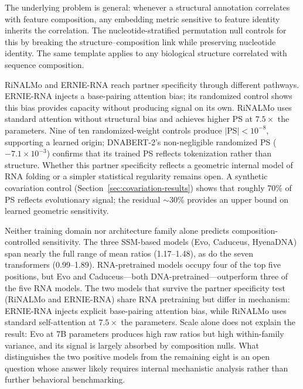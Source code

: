 \documentclass[11pt]{article}
\begin{document}
The underlying problem is general: whenever a structural annotation
correlates with feature composition, any embedding metric sensitive to
feature identity inherits the correlation. The nucleotide-stratified
permutation null controls for this by breaking the structure--composition
link while preserving nucleotide identity. The same template applies to
any biological structure correlated with sequence composition.

RiNALMo and ERNIE-RNA reach partner specificity through different pathways.
ERNIE-RNA injects a base-pairing attention bias; its randomized control
shows this bias provides capacity without producing signal on its own.
RiNALMo uses standard attention without structural bias and achieves higher
PS at $7.5\times$ the parameters. Nine of ten randomized-weight controls
produce $|\text{PS}| < 10^{-8}$, supporting a learned origin; DNABERT-2's
non-negligible randomized PS ($-7.1 \times 10^{-3}$) confirms that its trained
PS reflects tokenization rather than structure. Whether
this partner specificity reflects a geometric internal model of RNA folding
or a simpler statistical regularity remains open. A synthetic
covariation control (Section~\ref{sec:covariation-results}) shows that
roughly 70\% of PS reflects evolutionary signal; the residual
$\sim$30\% provides an upper bound on learned geometric sensitivity.

Neither training domain nor architecture family alone predicts
composition-controlled sensitivity. The three SSM-based models (Evo,
Caduceus, HyenaDNA) span nearly the full range of mean ratios
(1.17--1.48), as do the seven transformers (0.99--1.89). RNA-pretrained
models occupy four of the top five positions, but Evo and Caduceus---both
DNA-pretrained---outperform three of the five RNA models. The two models
that survive the partner specificity test (RiNALMo and ERNIE-RNA) share
RNA pretraining but differ in mechanism: ERNIE-RNA injects explicit
base-pairing attention bias, while RiNALMo uses standard self-attention at
$7.5\times$ the parameters. Scale alone does not explain the result:
Evo at 7B parameters produces high raw ratios but high within-family
variance, and its signal is largely absorbed by composition nulls. What
distinguishes the two positive models from the remaining eight is an open
question whose answer likely requires internal mechanistic analysis rather
than further behavioral benchmarking.
\end{document}
